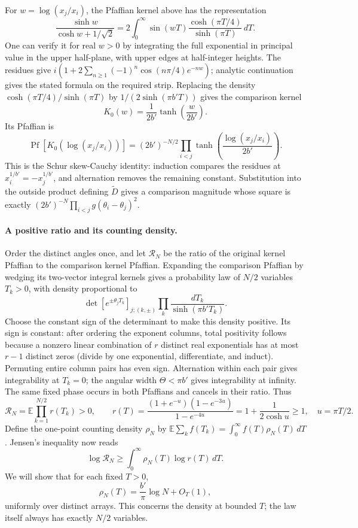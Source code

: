 For \(w=\log(x_j/x_i)\), the Pfaffian kernel above has the representation
\[
 \frac{\sinh w}{\cosh w+1/\sqrt2}
 =2\int_0^\infty \sin(wT)
             \frac{\cosh(\pi T/4)}{\sinh(\pi T)}\,dT.
\]
One can verify it for real \(w>0\) by integrating the full exponential
in principal value in the upper half-plane, with upper edges at
half-integer heights. The residues give
\(i(1+2\sum_{n\ge1}(-1)^n\cos(n\pi/4)e^{-nw})\); analytic
continuation gives the stated formula on the required strip.
Replacing the density \(\cosh(\pi T/4)/\sinh(\pi T)\) by
\(1/(2\sinh(\pi b'T))\) gives the comparison kernel
\[
 K_0(w)=\frac1{2b'}\tanh\!\left(\frac{w}{2b'}\right).
\]
Its Pfaffian is
\[
 \operatorname{Pf}[K_0(\log(x_j/x_i))]
 =(2b')^{-N/2}\prod_{i<j}
          \tanh\!\left(\frac{\log(x_j/x_i)}{2b'}\right).
\]
This is the Schur skew-Cauchy identity: induction compares the residues
at \(x_i^{1/b'}=-x_j^{1/b'}\), and alternation removes the remaining
constant. Substitution into the outside product defining
\(\widetilde D\) gives a comparison magnitude whose square is exactly
\((2b')^{-N}\prod_{i<j}g(\theta_i-\theta_j)^2\).

\paragraph{A positive ratio and its counting density.}
Order the distinct angles once, and let \(\mathcal R_N\) be the ratio
of the original kernel Pfaffian to the comparison kernel Pfaffian.
Expanding the comparison Pfaffian by wedging its two-vector integral
kernels gives a probability law of \(N/2\) variables \(T_k>0\), with
density proportional to
\[
 \det[e^{\pm\theta_jT_k}]_{j;(k,\pm)}
          \prod_k\frac{dT_k}{\sinh(\pi b'T_k)}.
\]
Choose the constant sign of the determinant to make this density
positive. Its sign is constant: after ordering the exponent columns,
total positivity follows because a nonzero linear combination of
\(r\) distinct real exponentials has at most \(r-1\) distinct zeros
(divide by one exponential, differentiate, and induct). Permuting
entire column pairs has even sign. Alternation within each pair gives
integrability at \(T_k=0\); the angular width \(\Theta<\pi b'\)
gives integrability at infinity. The same fixed phase occurs in both
Pfaffians and cancels in their ratio. Thus
\[
 \mathcal R_N=\mathbb E\prod_{k=1}^{N/2}r(T_k)>0,
 \qquad
 r(T)=\frac{(1+e^{-u})(1-e^{-3u})}{1-e^{-4u}}
     =1+\frac1{2\cosh u}\ge1,
 \quad u=\pi T/2.
\]
Define the one-point counting density \(\rho_N\) by
\(\mathbb E\sum_k f(T_k)=\int_0^\infty f(T)\rho_N(T)\,dT\).
Jensen's inequality now reads
\begin{equation}
 \log\mathcal R_N\ge
        \int_0^\infty\rho_N(T)\log r(T)\,dT.             \label{c4:Pair-Jensen}
\end{equation}
We will show that for each fixed \(T>0\),
\[
 \rho_N(T)=\frac{b'}\pi\log N+O_T(1),
\]
uniformly over distinct arrays. This concerns the density at bounded
\(T\); the law itself always has exactly \(N/2\) variables.

